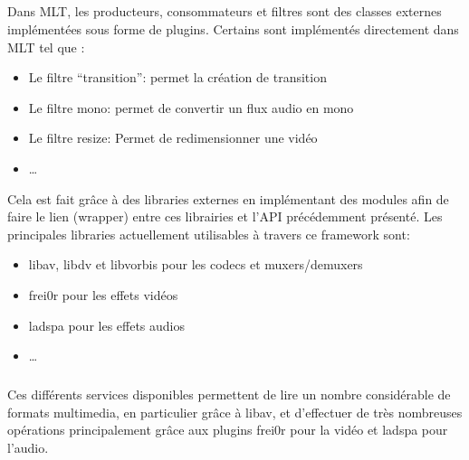 \subparagraph{}

Dans MLT, les producteurs, consommateurs et filtres sont des
classes externes implémentées sous forme de plugins. Certains sont
implémentés directement dans MLT tel que :

\begin{itemize}

  \item {Le filtre ``transition'': permet la création de transition}

  \item {Le filtre mono: permet de convertir un flux audio en mono}

  \item {Le filtre resize: Permet de redimensionner une vidéo}

  \item {\ldots}

\end{itemize}

Cela est fait grâce à des libraries externes en implémentant des
modules afin de faire le lien (wrapper)  entre ces librairies
et l'API précédemment présenté. Les principales libraries
actuellement utilisables à travers ce framework sont:

\begin{itemize}

  \item {libav, libdv et libvorbis pour les codecs et muxers/demuxers}

  \item {frei0r pour les effets vidéos}

  \item {ladspa pour les effets audios}

  \item {\ldots}

\end{itemize}

\subparagraph{}

Ces différents services disponibles permettent de lire un nombre
considérable de formats multimedia, en particulier grâce à libav,
et d'effectuer de très nombreuses opérations principalement grâce
aux plugins frei0r pour la vidéo et ladspa pour l'audio.

